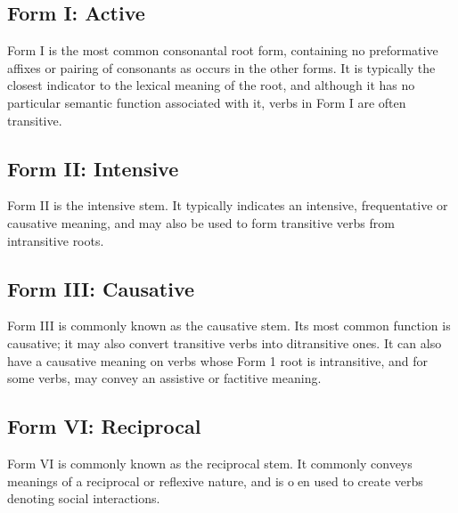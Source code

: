 \documentclass[grammar]{subfiles}
\begin{document}
  \subsection{Form I: Active}
  \label{ssec:vm_verb_form_i}

  Form I is the most common consonantal root form, containing no preformative
  affixes or pairing of consonants as occurs in the other forms.  It is
  typically the closest indicator to the lexical meaning of the root, and
  although it has no particular semantic function associated with it, verbs in
  Form I are often transitive.


  \subsection{Form II: Intensive}
  \label{ssec:vm_form_ii}

  Form II is the intensive stem. It typically indicates an intensive,
  frequentative or causative meaning, and may also be used to form transitive
  verbs from intransitive roots.
   
   
  \subsection{Form III: Causative}
  \label{ssec:vm_form_iii}

   Form III is commonly known as the causative stem. Its most common function
   is causative; it may also convert transitive verbs into ditransitive ones.
   It can also have a causative meaning on verbs whose Form 1 root is
   intransitive, and for some verbs, may convey an assistive or factitive
   meaning.
   
%   
  \subsection{Form VI: Reciprocal}
  \label{ssec:vm_form_vi}

   Form VI is commonly known as the reciprocal stem. It commonly conveys
   meanings of a reciprocal or reflexive nature, and is oen used to create
   verbs denoting social interactions. 
   
%   
\end{document}
